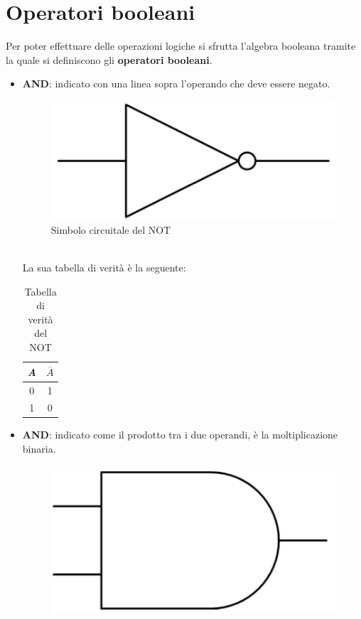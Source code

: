 \documentclass[12pt, a4paper]{report}
\begin{document}
\section{Operatori booleani}
Per poter effettuare delle operazioni logiche si sfrutta l'algebra booleana tramite la quale si definiscono gli \textbf{operatori booleani}.
\begin{itemize}
    \item\textbf{AND}: indicato con una linea sopra l'operando che deve essere negato.
    \begin{figure}[h]
    \centering
    \includegraphics[scale=0.5,angle=0]{logica_not.png}
    \caption{Simbolo circuitale del NOT}
    \end{figure}
    \\La sua tabella di verità è la seguente:
    \begin{table}[h]
        \centering
        \begin{tabular}{c|c}
        \em A & $\overline{A}$\\\hline
        0 &1\\
        1 &0
        \end{tabular}
        \caption{Tabella di verità del NOT}
    \end{table}
    \item\textbf{AND}: indicato come il prodotto tra i due operandi, è la moltiplicazione binaria.
    \begin{figure}[h]
        \centering
        \includegraphics[scale=0.5,angle=0]{logica_and.png}

\end{figure}
\end{itemize}
\end{document}

